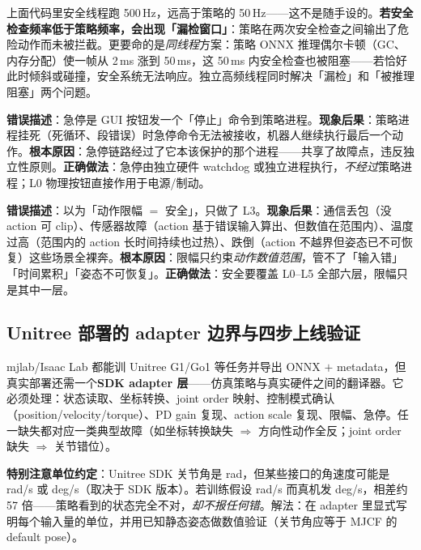 \begin{insight}[为什么安全检查频率必须高于策略频率]\label{ins:rlmc-s2r-safety-freq}
上面代码里安全线程跑 500\,Hz，远高于策略的 50\,Hz——这不是随手设的。\textbf{若安全检查频率低于策略频率，会出现「漏检窗口」}：策略在两次安全检查之间输出了危险动作而未被拦截。更要命的是\emph{同线程}方案：策略 ONNX 推理偶尔卡顿（GC、内存分配）使一帧从 2\,ms 涨到 50\,ms，这 50\,ms 内安全检查也被阻塞——若恰好此时倾斜或碰撞，安全系统无法响应。独立高频线程同时解决「漏检」和「被推理阻塞」两个问题。
\end{insight}

\begin{pitfall}[急停只挂在 UI 层]
\textbf{错误描述}：急停是 GUI 按钮发一个「停止」命令到策略进程。\textbf{现象后果}：策略进程挂死（死循环、段错误）时急停命令无法被接收，机器人继续执行最后一个动作。\textbf{根本原因}：急停链路经过了它本该保护的那个进程——共享了故障点，违反独立性原则。\textbf{正确做法}：急停由独立硬件 watchdog 或独立进程执行，\emph{不经过}策略进程；L0 物理按钮直接作用于电源/制动。
\end{pitfall}

\begin{pitfall}
\textbf{错误描述}：以为「动作限幅 $=$ 安全」，只做了 L3。\textbf{现象后果}：通信丢包（没 action 可 clip）、传感器故障（action 基于错误输入算出、但数值在范围内）、温度过高（范围内的 action 长时间持续也过热）、跌倒（action 不越界但姿态已不可恢复）这些场景全裸奔。\textbf{根本原因}：限幅只约束\emph{动作数值范围}，管不了「输入错」「时间累积」「姿态不可恢复」。\textbf{正确做法}：安全要覆盖 L0--L5 全部六层，限幅只是其中一层。
\end{pitfall}

\subsection{Unitree 部署的 adapter 边界与四步上线验证}
\label{sec:rlmc-s2r-adapter}

mjlab/Isaac Lab 都能训 Unitree G1/Go1 等任务并导出 ONNX $+$ metadata，但真实部署还需一个\textbf{SDK adapter 层}——仿真策略与真实硬件之间的翻译器。它必须处理：状态读取、坐标转换、joint order 映射、控制模式确认（position/velocity/torque）、PD gain 复现、action scale 复现、限幅、急停。任一缺失都对应一类典型故障（如坐标转换缺失 $\Rightarrow$ 方向性动作全反；joint order 缺失 $\Rightarrow$ 关节错位）。

\textbf{特别注意单位约定}：Unitree SDK 关节角是 rad，但某些接口的角速度可能是 rad/s 或 deg/s（取决于 SDK 版本）。若训练假设 rad/s 而真机发 deg/s，相差约 57 倍——策略看到的状态完全不对，\emph{却不报任何错}。解法：在 adapter 里显式写明每个输入量的单位，并用已知静态姿态做数值验证（关节角应等于 MJCF 的 default pose）。

